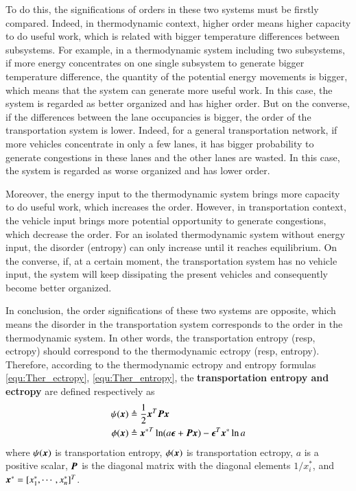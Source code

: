 \documentclass[preprint,authoryear,12pt]{elsarticle}
\renewcommand{\vec}[1]{\mbox{\boldmath$#1$}}
\newcommand{\mat}[1]{\mbox{\boldmath$#1$}}
\begin{document}
To do this, the significations of orders in these two systems must be
firstly compared. Indeed, in thermodynamic context, higher order
means higher capacity to do useful work, which is related with bigger
temperature differences between subsystems. For example, in a
thermodynamic system including two subsystems, if more energy
concentrates on one single subsystem to generate bigger temperature
difference, the quantity of the potential energy movements is bigger,
which means that the system can generate more useful work. In this
case, the system is regarded as better organized and has higher
order. But on the converse, if the differences between the lane
occupancies is bigger, the order of the transportation system is
lower. Indeed, for a general transportation network, if more vehicles
concentrate in only a few lanes, it has bigger probability to
generate congestions in these lanes and the other lanes are wasted.
In this case, the system is regarded as worse organized and has lower
order.

Moreover, the energy input to the thermodynamic system brings more
capacity to do useful work, which increases the order. However, in
transportation context, the vehicle input brings more potential
opportunity to generate congestions, which decrease the order. For an
isolated thermodynamic system without energy input, the disorder
(entropy) can only increase until it reaches equilibrium. On the
converse, if, at a certain moment, the transportation system has no
vehicle input, the system will keep dissipating the present vehicles
and consequently become better organized.

In conclusion, the order significations of these two systems are
opposite, which means the disorder in the transportation system
corresponds to the order in the thermodynamic system. In other words,
the transportation entropy (resp, ectropy) should correspond to the
thermodynamic ectropy (resp, entropy). Therefore, according to the
thermodynamic ectropy and entropy formulas \eqref{equ:Ther_ectropy},
\eqref{equ:Ther_entropy}, the \textbf{transportation entropy and
ectropy} are defined respectively as
\begin{align}
\label{equ:Tran_entropy}
\psi(\vec{x}) &\triangleq \frac{1}{2}\vec{x}^T \mat{P} \vec{x}\\
\phi(\vec{x}) &\triangleq{\vec{x}^*}^T \ln
(a\vec{\epsilon}+\mat{P}\vec{x}) -\vec{\epsilon}^T\vec{x}^*\ln a
\label{equ:Tran_ectropy}
\end{align}
where $\psi(\vec{x})$ is transportation entropy, $\phi(\vec{x})$ is
transportation ectropy, $a$ is a positive scalar, $\mat{P}$ is the
diagonal matrix with the diagonal elements $1/x_i^*$, and
$\vec{x}^*=[x_1^*,\cdots,x_n^*]^T$.
\end{document}
